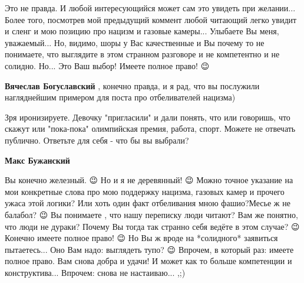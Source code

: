 \begin{itemize}
\begin{itemize}
Это не правда. И любой интересующийся может сам это увидеть при желании...
Более того, посмотрев мой предыдущий коммент любой читающий легко увидит и
сленг и мою позицию про нацизм и газовые камеры... Улыбаете Вы меня,
уважаемый... Но, видимо, шоры у Вас качественные и Вы почему то не понимаете,
что выглядите в этом странном разговоре и не компетентно и не солидно. Но...
Это Ваш выбор! Имеете полное право! 😉

 
\textbf{Вячеслав Богуславский} , конечно правда, и я рад, что вы послужили нагляднейшим примером для поста про отбеливателей нацизма)

 

Зря иронизируете. Девочку "пригласили" и дали понять, что или говоришь, что
скажут или "пока-пока" олимпийская премия, работа, спорт. Можете не отвечать
публично. Ответьте для себя - что бы вы выбрали?

 
\textbf{Макс Бужанский} 

Вы конечно железный. 😉 Но и я не деревянный! 😉 Можно точное указание на мои
конкретные слова про мою поддержку нацизма, газовых камер и прочего ужаса этой
логики? Или хоть один факт отбеливания мною фашио?Месье ж не балабол? 😉 Вы
понимаете , что нашу переписку люди читают? Вам же понятно, что люди не дураки?
Почему Вы тогда так странно себя ведёте в этом случае? 😉 Конечно имеете полное
право! 😉 Но Вы ж вроде на *солидного* заявиться пытаетесь... Оно Вам надо:
выглядеть тупо? 😉 Впрочем, в который раз: имеете полное право. Вам снова добра
и удачи! И может как то больше компетенции и конструктива... Впрочем: снова не
настаиваю... ,;)


 

\end{itemize}
\end{itemize}
